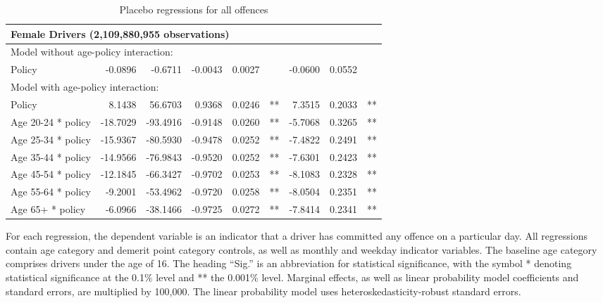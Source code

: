 \begin{table}
\begin{tabular}{l r r r r l r r l}
\hline 

\multicolumn{8}{l}{\textbf{Female Drivers} (2,109,880,955  observations)} \\ 

\hline
\multicolumn{8}{l}{Model without age-policy interaction: } \\ 
Policy                   &  -0.0896        &  -0.6711       &  -0.0043        &  0.0027       &            &  -0.0600        &  0.0552       &            \\ 
\hline
\multicolumn{8}{l}{Model with age-policy interaction: } \\ 
Policy                   &  8.1438        &  56.6703       &  0.9368        &  0.0246       &   **       &  7.3515        &  0.2033       &   **       \\ 
Age 20-24 * policy   &  -18.7029        &  -93.4916       &  -0.9148        &  0.0260       &   **       &  -5.7068        &  0.3265       &   **       \\ 
Age 25-34 * policy   &  -15.9367        &  -80.5930       &  -0.9478        &  0.0252       &   **       &  -7.4822        &  0.2491       &   **       \\ 
Age 35-44 * policy   &  -14.9566        &  -76.9843       &  -0.9520        &  0.0252       &   **       &  -7.6301        &  0.2423       &   **       \\ 
Age 45-54 * policy   &  -12.1845        &  -66.3427       &  -0.9702        &  0.0253       &   **       &  -8.1083        &  0.2328       &   **       \\ 
Age 55-64 * policy   &  -9.2001        &  -53.4962       &  -0.9720        &  0.0258       &   **       &  -8.0504        &  0.2351       &   **       \\ 
Age 65+ * policy   &  -6.0966        &  -38.1466       &  -0.9725        &  0.0272       &   **       &  -7.8414        &  0.2341       &   **       \\ 

\hline 

\end{tabular} 
\caption{Placebo regressions for all offences} 
For each regression, the dependent variable is an indicator that a driver has committed  
any offence on a particular day.  
All regressions contain age category and demerit point category controls, 
as well as monthly and weekday indicator variables. 
The baseline age category comprises drivers under the age of 16. 
The heading ``Sig.'' is an abbreviation for statistical significance, with 
the symbol * denoting statistical significance at the 0.1\% level 
and ** the 0.001\% level. 
Marginal effects, as well as linear probability model coefficients and standard errors, are  
multiplied by 100,000.  
The linear probability model uses heteroskedasticity-robust standard errors. 
\label{tab:seas_Logit_vs_LPMx100K_placebo_regs} 
\end{table} 
 
